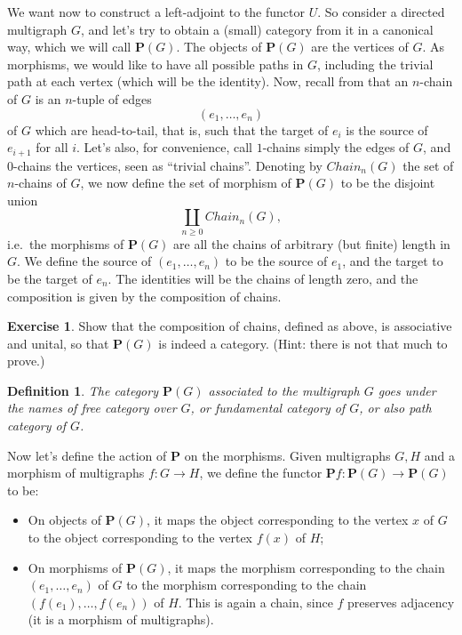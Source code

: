 \documentclass[a4paper,11pt,oneside]{scrbook}
\numberwithin{equation}{section}
\theoremstyle{plain}
\newtheorem{deph}[thm]{Definition}
\theoremstyle{definition}
\newtheorem{ex}[thm]{Exercise}
\newcommand{\cat}[1]{{\mathbf{#1}}} %
\DeclareMathOperator{\1}{\mathbbm{1}}
\DeclareMathOperator{\2}{\mathbbm{2}}
\begin{document}
We want now to construct a left-adjoint to the functor $U$. So consider a directed multigraph $G$, and let's try to obtain a (small) category from it in a canonical way, which we will call $\cat{P}(G)$. The objects of $\cat{P}(G)$ are the vertices of $G$. As morphisms, we would like to have all possible paths in $G$, including the trivial path at each vertex (which will be the identity). Now, recall from  that an $n$-chain of $G$ is an $n$-tuple of edges 
$$
(e_1,\dots,e_n)
$$ 
of $G$ which are head-to-tail, that is, such that the target of $e_i$ is the source of $e_{i+1}$ for all $i$. Let's also, for convenience, call $1$-chains simply the edges of $G$, and $0$-chains the vertices, seen as ``trivial chains''. Denoting by $\mathit{Chain}_n(G)$ the set of $n$-chains of $G$, we now define the set of morphism of $\cat{P}(G)$ to be the disjoint union
$$
\coprod_{n\ge 0} \mathit{Chain}_n(G) ,
$$
i.e.~the morphisms of $\cat{P}(G)$ are all the chains of arbitrary (but finite) length in $G$. We define the source of $(e_1,\dots,e_n)$ to be the source of $e_1$, and the target to be the target of $e_n$. The identities will be the chains of length zero, and the composition is given by the composition of chains. 

\begin{ex}
 Show that the composition of chains, defined as above, is associative and unital, so that $\cat{P}(G)$ is indeed a category. (Hint: there is not that much to prove.)
\end{ex}

\begin{deph}
 The category $\cat{P}(G)$ associated to the multigraph $G$ goes under the names of \emph{free category over $G$}, or \emph{fundamental category of $G$}, or also \emph{path category of $G$}. 
\end{deph}


Now let's define the action of $\cat{P}$ on the morphisms. Given multigraphs $G,H$ and a morphism of multigraphs $f:G\to H$, we define the functor $\cat{P}f:\cat{P}(G)\to\cat{P}(G)$ to be:
\begin{itemize}
 \item On objects of $\cat{P}(G)$, it maps the object corresponding to the vertex $x$ of $G$ to the object corresponding to the vertex $f(x)$ of $H$;
 \item On morphisms of $\cat{P}(G)$, it maps the morphism corresponding to the chain $(e_1,\dots,e_n)$ of $G$ to the morphism corresponding to the chain $(f(e_1),\dots,f(e_n))$ of $H$. This is again a chain, since $f$ preserves adjacency (it is a morphism of multigraphs).
\end{itemize}
\end{document}
